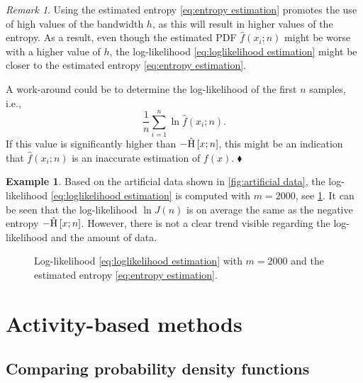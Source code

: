 \documentclass[10pt,final,a4paper,oneside,onecolumn]{article}
\newlength\figurewidth
\newlength\figureheight
\newcommand{\hatentropy}[1]{\hat{\textup{H}} \left[ #1 \right]}
\theoremstyle{plain}\newtheorem{definition}{Definition}[section]    %
\theoremstyle{definition}\newtheorem{example}{Example}[section]     %
\theoremstyle{remark}\newtheorem{remarkenv}{Remark}[section]        %
\newenvironment{remark}{\begin{remarkenv}}%
                       {\hfill$\blacklozenge$\end{remarkenv}}       %
\begin{document}
\begin{remark}
	Using the estimated entropy \eqref{eq:entropy estimation} promotes the use of high values of the bandwidth $h$, as this will result in higher values of the entropy. As a result, even though the estimated PDF $\hat{f}(x_i;n)$ might be worse with a higher value of $h$, the log-likelihood \cref{eq:loglikelihood estimation} might be closer to the estimated entropy \eqref{eq:entropy estimation}.
	
	A work-around could be to determine the log-likelihood of the first $n$ samples, i.e.,
	\begin{equation}
		\frac{1}{n} \sum_{i=1}^n \ln \hat{f} (x_i; n).
	\end{equation}
	If this value is significantly higher than $-\hatentropy{x;n}$, this might be an indication that $\hat{f}(x_i; n)$ is an inaccurate estimation of $f(x)$.
\end{remark}

\begin{example} \label{example:likelihood sample based}
	Based on the artificial data shown in \cref{fig:artificial data}, the log-likelihood \eqref{eq:loglikelihood estimation} is computed with $m=2000$, see \cref{fig:likelihood sample based}. It can be seen that the log-likelihood $\ln J(n)$ is on average the same as the negative entropy $-\hatentropy{x;n}$. However, there is not a clear trend visible regarding the log-likelihood and the amount of data.
	
	\setlength{}
	\setlength\figureheight{0.7\figurewidth}
	\begin{figure}
		\centering
		\caption{Log-likelihood \cref{eq:loglikelihood estimation} with $m=2000$ and the estimated entropy \cref{eq:entropy estimation}.}
		\label{fig:likelihood sample based}
	\end{figure}
\end{example}


\section{Activity-based methods}
\label{sec:activity based methods}


\subsection{Comparing probability density functions}
\label{sec:comparing pdf activities}
\end{document}
